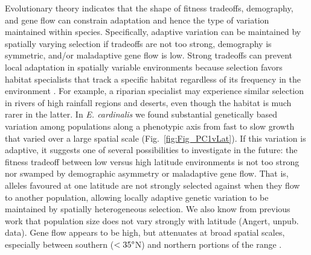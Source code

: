 \documentclass[11pt, oneside]{article}
\begin{document}
Evolutionary theory indicates that the shape of fitness tradeoffs, demography, and gene flow can constrain adaptation \citep{Levins_1968, Ronce_Kirkpatrick_2001, Lenormand_2002} and hence the type of variation maintained within species. Specifically, adaptive variation can be maintained by spatially varying selection if tradeoffs are not too strong, demography is symmetric, and/or maladaptive gene flow is low. Strong tradeoffs can prevent local adaptation in spatially variable environments because selection favors habitat specialists that track a specific habitat regardless of its frequency in the environment \citep{Levins_1968}. For example, a riparian specialist may experience similar selection in rivers of high rainfall regions and deserts, even though the habitat is much rarer in the latter. In \textit{E. cardinalis} we found substantial genetically based variation among populations along a phenotypic axis from fast to slow growth that varied over a large spatial scale (Fig.~\ref{fig:Fig_PC1vLat}). If this variation is adaptive, it suggests one of several possibilities to investigate in the future: the fitness tradeoff between low versus high latitude environments is not too strong nor swamped by demographic asymmetry or maladaptive gene flow. That is, alleles favoured at one latitude are not strongly selected against when they flow to another population, allowing locally adaptive genetic variation to be maintained by spatially heterogeneous selection. We also know from previous work that population size does not vary strongly with latitude (Angert, unpub. data). Gene flow appears to be high, but attenuates at broad spatial scales, especially between southern ($<35\degree$N) and northern portions of the range \citep{Paul_etal_2016}.  
\end{document}
